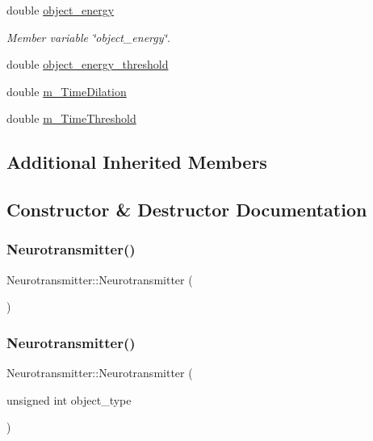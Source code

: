 \begin{DoxyCompactItemize}
double \mbox{\hyperlink{classNeurotransmitter_a3cc474a0f16ffe26d7f4403551cce222}{object\+\_\+energy}}
\begin{DoxyCompactList}\small\item\em Member variable \char`\"{}object\+\_\+energy\char`\"{}. \end{DoxyCompactList}\item 
double \mbox{\hyperlink{classNeurotransmitter_aa3e998b3dfc01ec3c0b02080ffeb0d46}{object\+\_\+energy\+\_\+threshold}}
\item 
double \mbox{\hyperlink{classNeurotransmitter_ae04cfd2ef2be895457c293463e8ba24f}{m\+\_\+\+Time\+Dilation}}
\item 
double \mbox{\hyperlink{classNeurotransmitter_a27b12315e40389dfd903c5e9cd188768}{m\+\_\+\+Time\+Threshold}}
\end{DoxyCompactItemize}
\subsection*{Additional Inherited Members}


\subsection{Constructor \& Destructor Documentation}
\mbox{\label{classNeurotransmitter_a05883c62f2c20b8034121a46c50de00f}} 
\subsubsection{\texorpdfstring{Neurotransmitter()}{Neurotransmitter()}\hspace{0.1cm}{\footnotesize\ttfamily [1/4]}}
{\footnotesize\ttfamily Neurotransmitter\+::\+Neurotransmitter (\begin{DoxyParamCaption}{ }\end{DoxyParamCaption})\hspace{0.3cm}{\ttfamily [inline]}}

\mbox{\label{classNeurotransmitter_adca6f02b1a9c98d269e3909e1e2f0463}} 
\subsubsection{\texorpdfstring{Neurotransmitter()}{Neurotransmitter()}\hspace{0.1cm}{\footnotesize\ttfamily [2/4]}}
{\footnotesize\ttfamily Neurotransmitter\+::\+Neurotransmitter (\begin{DoxyParamCaption}\item[{unsigned int}]{object\+\_\+type }\end{DoxyParamCaption})\hspace{0.3cm}{\ttfamily [inline]}}

